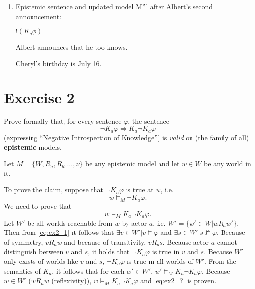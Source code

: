 \documentclass[leqno]{article}
\begin{document}
\begin{enumerate}[label=(\alph*)]
    \item Epistemic sentence and updated model M''' after Albert's second announcement:
    
    $!(K_a \phi)$
    
    Albert announces that he too knows.
    
    \begin{center}
    \end{center}

    Cheryl's birthday is July 16.

\end{enumerate}

\section{Exercise 2}
Prove formally that, for every sentence \(\varphi\), the sentence
\[\neg K_{a}\varphi \Rightarrow K_{a}\neg K_{a}\varphi\]
(expressing ``Negative Introspection of Knowledge'') is \textit{valid} on (the family of all) \textbf{epistemic} models.

Let $M = \{W, R_a, R_b, \dots, \nu\}$ be any epistemic model and let $w \in W$ be any world in it.

To prove the claim, suppose that $\neg K_a \varphi$ is true at $w$, i.e.
\begin{equation}
	\tag{1} \label{eq:ex2_1}
	w \models_M \neg K_a \varphi.
\end{equation}
We need to prove that
\begin{equation}
	\tag{?} \label{eq:ex2_?}
	w \models_M K_a \neg K_a \varphi.
\end{equation}
Let $W'$ be all worlds reachable from $w$ by actor $a$, i.e. $W' = \{w' \in W| w R_a w'\}$. Then from \eqref{eq:ex2_1} it follows that $\exists v \in W'| v \models \varphi$ and $\exists s \in W'| s \not \models \varphi$. Because of symmetry, $v R_a w$ and because of transitivity, $v R_a s$. Because actor $a$ cannot distinguish between $v$ and $s$, it holds that $\neg K_a \varphi$ is true in $v$ and $s$. Because $W'$ only exists of worlds like $v$ and $s$, $\neg K_a \varphi$ is true in all worlds of $W'$. From the semantics of $K_a$, it follows that for each $w' \in W'$, $w' \models_M K_a \neg K_a \varphi$. Because $w \in W'$ ($w R_a w$ (reflexivity)), $w \models_M K_a \neg K_a \varphi$ and \eqref{eq:ex2_?} is proven.
\end{document}

